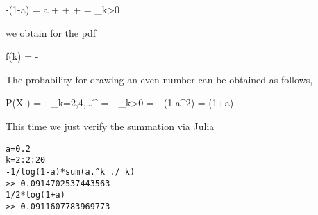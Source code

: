 \bee
-\ln(1-a) = a +  +  + \cdots = \sum_{k>0} 
\eee

we obtain for the pdf

\bee
f(k) = - 
\eee

The probability for drawing an even number can be obtained as follows,

\bee
P(X ) = - \sum_{k=2,4,\ldots}^\infty {} = - \sum_{k>0}  = - \ln(1-a^2) =  \ln(1+a)
\eee

This time we just verify the summation via Julia

\begin{verbatim}
a=0.2
k=2:2:20
-1/log(1-a)*sum(a.^k ./ k)
>> 0.0914702537443563
1/2*log(1+a)
>> 0.0911607783969773
\end{verbatim}

